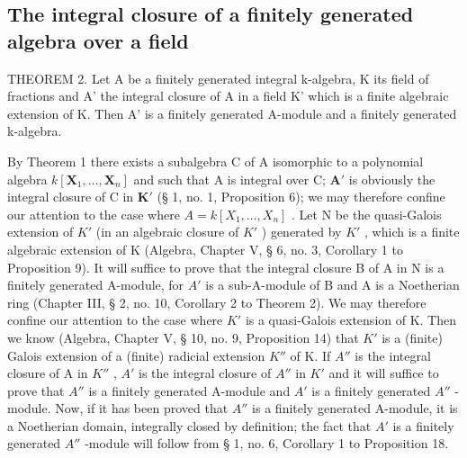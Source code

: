 \subsection{The integral closure of a finitely generated algebra over a field}

THEOREM 2. Let A be a finitely generated integral k-algebra, K its field of fractions and A' the integral closure of A in a field K' which is a finite algebraic extension of K. Then A' is a finitely generated A-module and a finitely generated k-algebra.

By Theorem 1 there exists a subalgebra C of A isomorphic to a polynomial algebra \(k[\mathbf{X}_1, \ldots, \mathbf{X}_n]\) and such that A is integral over C; \(\mathbf{A}'\) is obviously the integral closure of C in \(\mathbf{K}'\) (§ 1, no. 1, Proposition 6); we may therefore confine our attention to the case where \(A = k[X_{1}, \ldots, X_{n}]\) . Let N be the quasi-Galois extension of \(K'\) (in an algebraic closure of \(K'\) ) generated by \(K'\) , which is a finite algebraic extension of K (Algebra, Chapter V, § 6, no. 3, Corollary 1 to Proposition 9). It will suffice to prove that the integral closure B of A in N is a finitely generated A-module, for \(A'\) is a sub-A-module of B and A is a Noetherian ring (Chapter III, § 2, no. 10, Corollary 2 to Theorem 2). We may therefore confine our attention to the case where \(K'\) is a quasi-Galois extension of K. Then we know (Algebra, Chapter V, § 10, no. 9, Proposition 14) that \(K'\) is a (finite) Galois extension of a (finite) radicial extension \(K''\) of K. If \(A''\) is the integral closure of A in \(K''\) , \(A'\) is the integral closure of \(A''\) in \(K'\) and it will suffice to prove that \(A''\) is a finitely generated A-module and \(A'\) is a finitely generated \(A''\) -module. Now, if it has been proved that \(A''\) is a finitely generated A-module, it is a Noetherian domain, integrally closed by definition; the fact that \(A'\) is a finitely generated \(A''\) -module will follow from § 1, no. 6, Corollary 1 to Proposition 18.

